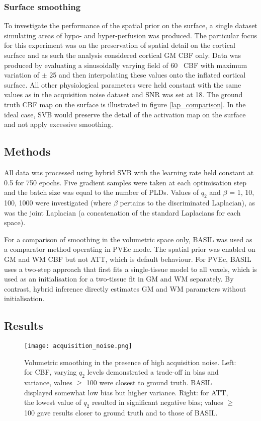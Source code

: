 \subsubsection{Surface smoothing}

To investigate the performance of the spatial prior on the surface, a single dataset simulating areas of hypo- and hyper-perfusion was produced. The particular focus for this experiment was on the preservation of spatial detail on the cortical surface and as such the analysis considered cortical GM CBF only. Data was produced by evaluating a sinusoidally varying field of 60 \cbf\ CBF with maximum variation of $\pm$ 25 and then interpolating these values onto the inflated cortical surface. All other physiological parameters were held constant with the same values as in the acquisition noise dataset and SNR was set at 18. The ground truth CBF map on the surface is illustrated in figure \ref{lap_comparison}. In the ideal case, SVB would preserve the detail of the activation map on the surface and not apply excessive smoothing. 

\subsection{Methods}

All data was processed using hybrid SVB with the learning rate held constant at 0.5 for 750 epochs. Five gradient samples were taken at each optimisation step and the batch size was equal to the number of PLDs. Values of $q_2$ and $\beta$ = 1, 10, 100, 1000 were investigated (where $\beta$ pertains to the discriminated Laplacian), as was the joint Laplacian (a concatenation of the standard Laplacians for each space). 

For a comparison of smoothing in the volumetric space only, BASIL was used as a comparator method operating in PVEc mode. The spatial prior was enabled on GM and WM CBF but not ATT, which is default behaviour. For PVEc, BASIL uses a two-step approach that first fits a single-tissue model to all voxels, which is used as an initialisation for a two-tissue fit in GM and WM separately. By contrast, hybrid inference directly estimates GM and WM parameters without initialisation. 

\subsection{Results}

\begin{figure}[H]
\centering
\texttt{[image: acquisition\_noise.png]}
\caption{Volumetric smoothing in the presence of high acquisition noise. Left: for CBF, varying $q_2$ levels demonstrated a trade-off in bias and variance, values $\geq$ 100 were closest to ground truth. BASIL displayed somewhat low bias but higher variance. Right: for ATT, the lowest value of $q_2$ resulted in significant negative bias; values $\geq$ 100 gave results closer to ground truth and to those of BASIL.}
\label{acquisition_noise} 
\end{figure}

